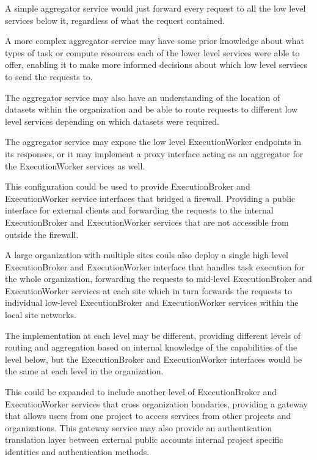 \documentclass[11pt,a4paper]{ivoa}
\newcommand{\execbrokerclass} {ExecutionBroker}
\newcommand{\execworkerclass} {ExecutionWorker}
\newcommand{\dataset}[1] {dataset#1}
\begin{document}
A simple aggregator service would just forward every request to all the low level services below it,
regardless of what the request contained.

A more complex aggregator service may have some prior knowledge about what types of task or compute resources
each of the lower level services were able to offer, enabling it to make more informed decisions about
which low level serviecs to send the requests to.

The aggregator service may also have an understanding of the location of \dataset{s} within the organization and
be able to route requests to different low level services depending on which \dataset{s} were required.

The aggregator service may expose the low level \execworkerclass{} endpoints in its responses,
or it may implement a proxy interface acting as an aggregator for the \execworkerclass{}
services as well.

This configuration could be used to provide \execbrokerclass{} and \execworkerclass{} service interfaces
that bridged a firewall. Providing a public interface for external clients and forwarding the requests
to the internal \execbrokerclass{} and \execworkerclass{} services that are not accessible from outside the
firewall.

A large organization with multiple sites couls also deploy a single high level \execbrokerclass{} and \execworkerclass{}
interface that handles task execution for the whole organization, forwarding the requests to mid-level
\execbrokerclass{} and \execworkerclass{} services at each site which in turn forwards the requests to
individual low-level \execbrokerclass{} and \execworkerclass{} services within the local site networks.

The implementation at each level may be different, providing different levels of routing
and aggregation based on internal knowledge of the capabilities of the level below,
but the \execbrokerclass{} and \execworkerclass{} interfaces would be the same at each level
in the organization.

This could be expanded to include another level of \execbrokerclass{} and \execworkerclass{} services that
cross organization bondaries, providing a gateway that allows users from one project to access services
from other projects and organizations. This gateway service may also provide an authentication translation
layer between external public accounts internal project specific identities and authentication methods.
\end{document}
